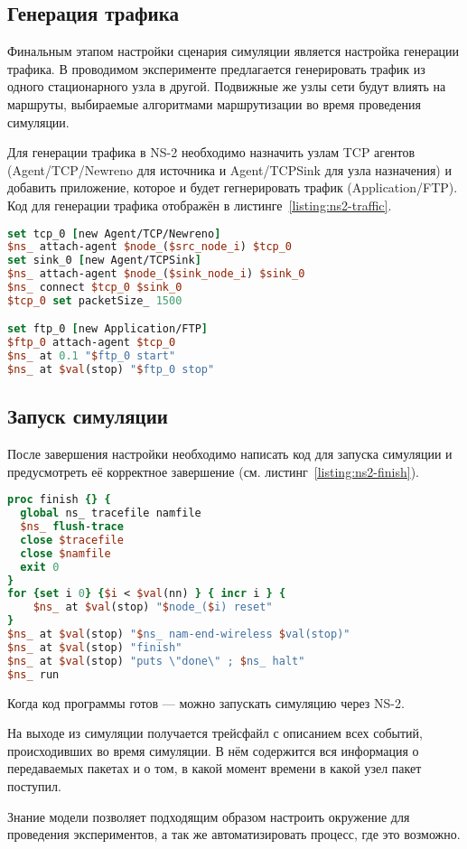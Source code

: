 \subsection{Генерация трафика}

Финальным этапом настройки сценария симуляции является настройка генерации трафика. В проводимом эксперименте предлагается генерировать трафик из одного стационарного узла в другой. Подвижные же узлы сети будут влиять на маршруты, выбираемые алгоритмами маршрутизации во время проведения симуляции.

Для генерации трафика в NS-2 необходимо назначить узлам TCP агентов \linebreak(Agent/TCP/Newreno для источника и Agent/TCPSink для узла назначения) и добавить приложение, которое и будет гегнерировать трафик (Application/FTP). Код для генерации трафика отображён в листинге~\ref{listing:ns2-traffic}.

\begin{lstlisting}[language=tcl, style=mystyle, caption=Генерация трафика, label=listing:ns2-traffic]
set tcp_0 [new Agent/TCP/Newreno]
$ns_ attach-agent $node_($src_node_i) $tcp_0
set sink_0 [new Agent/TCPSink]
$ns_ attach-agent $node_($sink_node_i) $sink_0
$ns_ connect $tcp_0 $sink_0
$tcp_0 set packetSize_ 1500

set ftp_0 [new Application/FTP]
$ftp_0 attach-agent $tcp_0
$ns_ at 0.1 "$ftp_0 start"
$ns_ at $val(stop) "$ftp_0 stop"

\end{lstlisting}

\subsection{Запуск симуляции}

После завершения настройки необходимо написать код для запуска симуляции и предусмотреть её корректное завершение (см. листинг~\ref{listing:ns2-finish}).

\begin{lstlisting}[language=tcl, style=mystyle, caption=Запуск сценария и завершение, label=listing:ns2-finish]
proc finish {} {
  global ns_ tracefile namfile
  $ns_ flush-trace
  close $tracefile
  close $namfile
  exit 0
}
for {set i 0} {$i < $val(nn) } { incr i } {
    $ns_ at $val(stop) "$node_($i) reset"
}
$ns_ at $val(stop) "$ns_ nam-end-wireless $val(stop)"
$ns_ at $val(stop) "finish"
$ns_ at $val(stop) "puts \"done\" ; $ns_ halt"
$ns_ run
\end{lstlisting}

Когда код программы готов --- можно запускать симуляцию через NS-2.

На выходе из симуляции получается трейсфайл с описанием всех событий, происходивших во время симуляции. В нём содержится вся информация о передаваемых пакетах и о том, в какой момент времени в какой узел пакет поступил.

Знание модели позволяет подходящим образом настроить окружение для проведения экспериментов, а так же автоматизировать процесс, где это возможно.
 